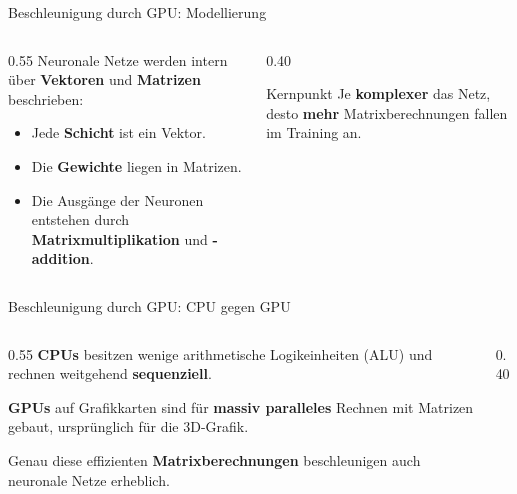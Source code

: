 \begin{frame}{Beschleunigung durch GPU: Modellierung}
\begin{columns}
\begin{column}{0.55\textwidth}
Neuronale Netze werden intern über \textbf{Vektoren} und \textbf{Matrizen} beschrieben:
\begin{itemize}
\item Jede \textbf{Schicht} ist ein Vektor.
\item Die \textbf{Gewichte} liegen in Matrizen.
\item Die Ausgänge der Neuronen entstehen durch \textbf{Matrixmultiplikation} und \textbf{-addition}.
\end{itemize}
\end{column}
\begin{column}{0.40\textwidth}
\begin{block}{Kernpunkt}
Je \textbf{komplexer} das Netz, desto \textbf{mehr} Matrixberechnungen fallen im Training an.
\end{block}
\end{column}
\end{columns}
\end{frame}

\begin{frame}{Beschleunigung durch GPU: CPU gegen GPU}
\begin{columns}
\begin{column}{0.55\textwidth}
\textbf{CPUs} besitzen wenige arithmetische Logikeinheiten (ALU) und rechnen weitgehend \textbf{sequenziell}.

\vspace{0.5em}
\textbf{GPUs} auf Grafikkarten sind für \textbf{massiv paralleles} Rechnen mit Matrizen gebaut, ursprünglich für die 3D-Grafik.

\vspace{0.5em}
Genau diese effizienten \textbf{Matrixberechnungen} beschleunigen auch neuronale Netze erheblich.
\end{column}
\begin{column}{0.40\textwidth}
\centering

\end{column}
\end{columns}
\end{frame}

